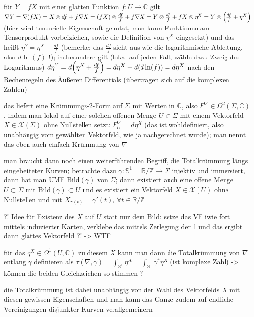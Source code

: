 \documentclass[../H_Analysis_main.tex]{subfiles}
\begin{document}
für  $Y = f X$ mit einer glatten Funktion $f: U \rightarrow \mathbb{C}$ gilt $\nabla Y = \nabla(f X) = X \otimes df + f \nabla X = \qty(f X) \otimes \frac{df}{f} + f \nabla X = Y \otimes \frac{df}{f} + f X \otimes \eta^X = Y \otimes \qty(\frac{df}{f} + \eta^X)$ (hier wird tensorielle Eigenschaft genutzt, man kann Funktionen am Tensorprodukt vorbeiziehen, sowie die Definition von $\eta^X$ eingesetzt) und das heißt $\eta^Y = \eta^X + \frac{df}{f}$ (bemerke: das $\frac{df}{f}$ sieht aus wie die logarithmische Ableitung, also $d\ln(f)$ !); insbesondere gilt (lokal auf jeden Fall, wähle dazu Zweig des Logarithmus) $d\eta^Y = d\qty(\eta^X + \frac{df}{f}) = d\eta^X + d\qty(d\ln(f)) = d\eta^X$ nach den Rechenregeln des Äußeren Differentials (übertragen sich auf die komplexen Zahlen)

das liefert eine Krümmungs-2-Form auf $\Sigma$ mit Werten in $\mathbb{C}$, also $F^\nabla \in \Omega^2(\Sigma, \mathbb{C})$, indem man lokal auf einer solchen offenen Menge $U \subset \Sigma$ mit einem Vektorfeld $X \in \mathcal{X}(\Sigma)$ ohne Nullstellen setzt: $F^\nabla_U = d\eta^X$ (das ist wohldefiniert, also unabhängig vom gewählten Vektorfeld, wie ja nachgerechnet wurde); man nennt das eben auch einfach Krümmung von $\nabla$


man braucht dann noch einen weiterführenden Begriff, die Totalkrümmung längs eingebetteter Kurven; betrachte dazu $\gamma: \mathbb{S}^1 = \mathbb{R}/ \mathbb{Z} \rightarrow \Sigma$ injektiv und immersiert, dann hat man UMF Bild$(\gamma)$ von $\Sigma$; dann existiert auch eine offene Menge $U \subset \Sigma$ mit Bild$(\gamma) \subset U$ und es existiert ein Vektorfeld $X \in \mathcal{X}(U)$ ohne Nullstellen und mit $X_{\gamma(t)} = \gamma'(t), \, \forall t \in \mathbb{R}/ \mathbb{Z}$

?! Idee für Existenz des $X$ auf $U$ statt nur dem Bild: setze das VF iwie fort mittels induzierter Karten, verklebe das mittels Zerlegung der 1 und das ergibt dann glattes Vektorfeld ?! -> WTF

für das $\eta^X \in \Omega^1(U, \mathbb{C})$ zu diesem $X$ kann man dann die Totalkrümmung von $\nabla$ entlang $\gamma$ definieren als $\tau(\nabla, \gamma) = \int_{\mathbb{S}^1} \eta^X = \int_{\mathbb{S}^1} \gamma^*\eta^X$ (ist komplexe Zahl) -> können die beiden Gleichzeichen so stimmen ?

die Totalkrümmung ist dabei unabhängig von der Wahl des Vektorfelds $X$ mit diesen gewissen Eigenschaften und man kann das Ganze zudem auf endliche Vereinigungen disjunkter Kurven verallgemeinern
\end{document}
